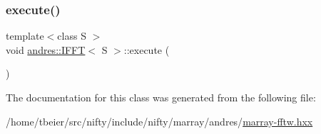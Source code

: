 \subsubsection{\texorpdfstring{execute()}{execute()}}
{\footnotesize\ttfamily template$<$class S $>$ \\
void \hyperlink{classandres_1_1IFFT}{andres\+::\+I\+F\+FT}$<$ S $>$\+::execute (\begin{DoxyParamCaption}{ }\end{DoxyParamCaption})\hspace{0.3cm}{\ttfamily [inline]}}



The documentation for this class was generated from the following file\+:\begin{DoxyCompactItemize}
\item 
/home/tbeier/src/nifty/include/nifty/marray/andres/\hyperlink{marray-fftw_8hxx}{marray-\/fftw.\+hxx}\end{DoxyCompactItemize}
